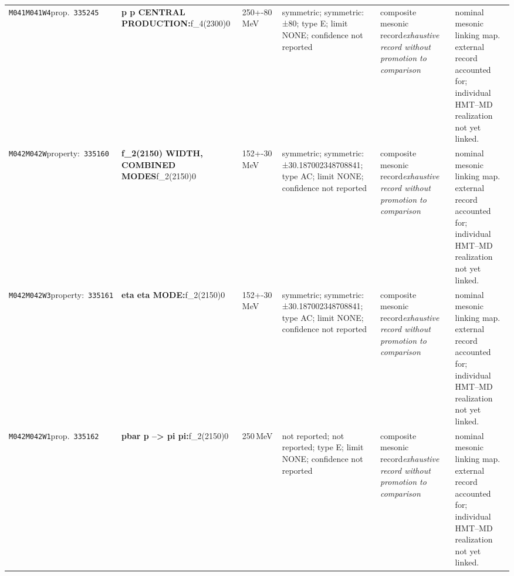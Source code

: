 \begin{landscape}
\begin{longtable}{L{1.85cm}L{4.45cm}L{2.35cm}L{4.05cm}L{3.35cm}L{7.15cm}}
\texttt{M041}\newline \texttt{M041W4}\newline prop.\ \texttt{335245} & \textbf{p p CENTRAL PRODUCTION:}\newline f\_\allowbreak{}4(2300)0 & 250+-80\,MeV & symmetric; symmetric: ±80; type E; limit NONE; confidence not reported & composite mesonic record\newline \emph{exhaustive record without promotion to comparison} & nominal mesonic linking map. external record accounted for; individual HMT--MD realization not yet linked. \\
\texttt{M042}\newline \texttt{M042W}\newline property:\ \texttt{335160} & \textbf{f\_\allowbreak{}2(2150) WIDTH, COMBINED MODES}\newline f\_\allowbreak{}2(2150)0 & 152+-30\,MeV & symmetric; symmetric: ±30.187002348708841; type AC; limit NONE; confidence not reported & composite mesonic record\newline \emph{exhaustive record without promotion to comparison} & nominal mesonic linking map. external record accounted for; individual HMT--MD realization not yet linked. \\
\texttt{M042}\newline \texttt{M042W3}\newline property:\ \texttt{335161} & \textbf{eta eta MODE:}\newline f\_\allowbreak{}2(2150)0 & 152+-30\,MeV & symmetric; symmetric: ±30.187002348708841; type AC; limit NONE; confidence not reported & composite mesonic record\newline \emph{exhaustive record without promotion to comparison} & nominal mesonic linking map. external record accounted for; individual HMT--MD realization not yet linked. \\
\texttt{M042}\newline \texttt{M042W1}\newline prop.\ \texttt{335162} & \textbf{pbar p --\textgreater{} pi pi:}\newline f\_\allowbreak{}2(2150)0 & 250\,MeV & not reported; not reported; type E; limit NONE; confidence not reported & composite mesonic record\newline \emph{exhaustive record without promotion to comparison} & nominal mesonic linking map. external record accounted for; individual HMT--MD realization not yet linked. \\

\end{longtable}
\end{landscape}

